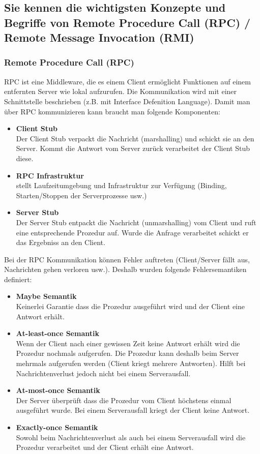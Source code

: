 \subsection{Sie kennen die wichtigsten Konzepte und Begriffe von Remote Procedure Call (RPC) / Remote Message Invocation (RMI)}

\subsubsection{Remote Procedure Call (RPC)}

RPC ist eine Middleware, die es einem Client ermöglicht Funktionen auf einem entfernten Server wie lokal aufzurufen. Die Kommunikation wird mit einer Schnittstelle beschrieben (z.B. mit Interface Defenition Language). Damit man über RPC kommunizieren kann braucht man folgende Komponenten:

\begin{itemize}
	\item \textbf{Client Stub} \\
	Der Client Stub verpackt die Nachricht (marshalling) und schickt sie an den Server. Kommt die Antwort vom Server zurück verarbeitet der Client Stub diese.
	\item \textbf{RPC Infrastruktur} \\
	stellt Laufzeitumgebung und Infrastruktur zur Verfügung (Binding, Starten/Stoppen der Serverprozesse usw.)
	\item \textbf{Server Stub} \\
	Der Server Stub entpackt die Nachricht (unmarshalling) vom Client und ruft eine entsprechende Prozedur auf. Wurde die Anfrage verarbeitet schickt er das Ergebniss an den Client.
\end{itemize}  

Bei der RPC Kommunikation können Fehler auftreten (Client/Server fällt aus, Nachrichten gehen verloren usw.). Deshalb wurden folgende Fehlersemantiken definiert:

\begin{itemize}
	\item \textbf{Maybe Semantik} \\
	Keinerlei Garantie dass die Prozedur ausgeführt wird und der Client eine Antwort erhält.
	\item \textbf{At-least-once Semantik} \\
	Wenn der Client nach einer gewissen Zeit keine Antwort erhält wird die Prozedur nochmals aufgerufen. Die Prozedur kann deshalb beim Server mehrmals aufgerufen werden (Client kriegt mehrere Antworten). Hilft bei Nachrichtenverlust jedoch nicht bei einem Serverausfall.
	\item \textbf{At-most-once Semantik} \\
	Der Server überprüft dass die Prozedur vom Client höchstens einmal ausgeführt wurde. Bei einem Serverausfall kriegt der Client keine Antwort.
	\item \textbf{Exactly-once Semantik} \\
	Sowohl beim Nachrichtenverlust als auch bei einem Serverausfall wird die Prozedur verarbeitet und der Client erhält eine Antwort.
\end{itemize}

